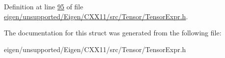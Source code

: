 Definition at line \hyperlink{eigen_2unsupported_2_eigen_2_c_x_x11_2src_2_tensor_2_tensor_expr_8h_source_l00095}{95} of file \hyperlink{eigen_2unsupported_2_eigen_2_c_x_x11_2src_2_tensor_2_tensor_expr_8h_source}{eigen/unsupported/\+Eigen/\+C\+X\+X11/src/\+Tensor/\+Tensor\+Expr.\+h}.



The documentation for this struct was generated from the following file\+:\begin{DoxyCompactItemize}
\item 
eigen/unsupported/\+Eigen/\+C\+X\+X11/src/\+Tensor/\+Tensor\+Expr.\+h\end{DoxyCompactItemize}
